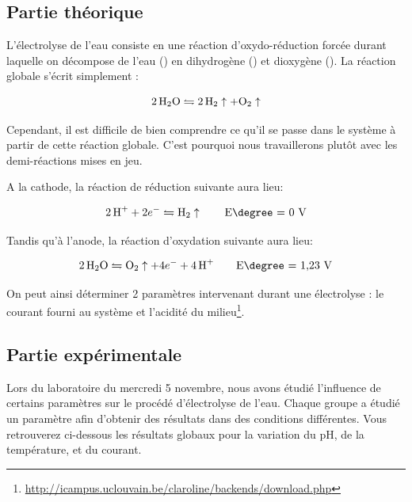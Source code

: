 \documentclass[10pt]{article}
\begin{document}
\subsection*{Partie théorique}


L’électrolyse de l’eau consiste en une réaction d’oxydo-réduction forcée durant laquelle on décompose de l’eau ()
en dihydrogène () et dioxygène (). La réaction globale s’écrit simplement : 

$$\ce{2H2O} \leftrightharpoons \ce{2H2}\uparrow + \ce{O2}\uparrow$$

Cependant, il est difficile de bien comprendre ce qu'il se passe dans le système à partir de cette réaction globale. C’est pourquoi nous travaillerons plutôt avec les demi-réactions mises en jeu.

A la cathode, la réaction de réduction suivante aura lieu:

$$\ce{2H+} + 2 e^{-} \leftrightharpoons \ce{H2}\uparrow  \qquad \text{E\degree = 0 V}$$

Tandis qu’à l’anode, la réaction d’oxydation suivante aura lieu:

$$\ce{2H2O} \leftrightharpoons \ce{O2}\uparrow + 4 e^{-} + \ce{4H+} \qquad \text{E\degree = 1,23 V}$$

On peut ainsi déterminer 2 paramètres intervenant durant une électrolyse : le courant fourni au système et 
l’acidité du milieu\footnote{\url{http://icampus.uclouvain.be/claroline/backends/download.php}}.


\subsection*{Partie expérimentale}

Lors du laboratoire du mercredi 5 novembre, nous avons étudié l'influence de certains paramètres sur le procédé d'électrolyse de l'eau. Chaque groupe a étudié un paramètre afin d'obtenir des résultats dans des conditions différentes. Vous retrouverez ci-dessous les résultats globaux pour la variation du pH, de la température, et du courant.
\end{document}
